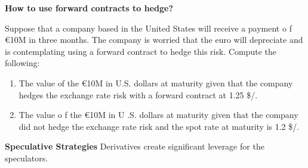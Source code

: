 \documentclass[11pt,fleqn]{report} %
\numberwithin{equation}{section} %
\numberwithin{figure}{section} %
\numberwithin{table}{section} %
\begin{document}
\begin{exercise}\textbf{How to use forward contracts to hedge?}

Suppose that a company based in the United States will receive a payment o f €10M in
three months. The company is worried that the euro will depreciate and is contemplating
using a forward contract to hedge this risk. Compute the following:
\begin{enumerate}
    \item The value of the €10M in U.S. dollars at maturity given that the company hedges the
exchange rate risk with a forward contract at 1.25 \$/\EUR.
    \item The value o f the €10M in U .S. dollars at maturity given that the company did not
hedge the exchange rate risk and the spot rate at maturity is 1.2 \$/\EUR.
\end{enumerate}
\end{exercise}

\begin{remark}\textbf{Speculative Strategies}
Derivatives create significant leverage for the speculators.
\end{remark}

\end{document}
